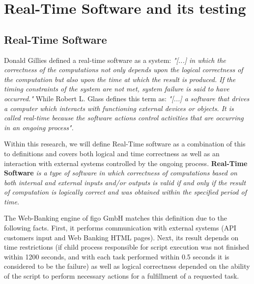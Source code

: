 \chapter{Real-Time Software and its testing}
\label{chap:rt}
\section{Real-Time Software}
Donald Gillies defined a real-time software as a system: \textit{"[...] in which the correctness of the computations not only depends upon the logical correctness of the computation but also upon the time at which the result is produced. If the timing constraints of the system are not met, system failure is said to have occurred."} While Robert L. Glass\cite{RealTimeTesting} defines this term as: \textit{"[...] a software that drives a computer which interacts with functioning external devices or objects. It is called real-time because the software actions control activities that are occurring in an ongoing process".} 

Within this research, we will define  Real-Time software as a combination of this to definitions and covers both logical and time correctness as well as an interaction with external systems controlled by the ongoing process. \textbf{Real-Time Software} \textit{is a type of software in which correctness of computations based on both internal and external inputs and/or outputs is valid if and only if the result of computation is logically correct and was obtained within the specified period of time.}

The Web-Banking engine of figo GmbH matches this definition due to the following facts. First, it performs communication with external systems (API customers input and Web Banking HTML pages). Next, its result depends on time restrictions (if child process responsible for script execution was not finished within 1200 seconds, and with each task performed within 0.5 seconds it is considered to be the failure) as well as logical correctness depended on the ability of the script to perform necessary actions for a fulfillment of a requested task.



